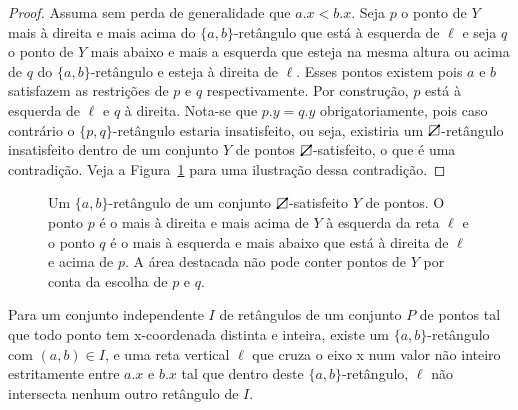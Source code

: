 \begin{proof}
    Assuma sem perda de generalidade que $a.x < b.x$.
    Seja $p$ o ponto de $Y$ mais à direita e mais acima do $\{a,b\}$-retângulo que está à esquerda de $\ell$ e seja $q$ o ponto de $Y$ mais abaixo e mais a esquerda que esteja na mesma altura ou acima de $q$ do $\{a,b\}$-retângulo e esteja à direita de $\ell$. Esses pontos existem pois $a$ e $b$ satisfazem as restrições de $p$ e $q$ respectivamente. Por construção, $p$ está à esquerda de $\ell$ e $q$ à direita. Nota-se que $p.y = q.y$ obrigatoriamente, pois caso contrário o $\{p,q\}$-retângulo estaria insatisfeito, ou seja, existiria um $\rectpos$-retângulo insatisfeito dentro de um conjunto $Y$ de pontos $\rectpos$-satisfeito, o que é uma contradição. Veja a Figura~\ref{fig:contraexemplo_contradicao} para uma ilustração dessa contradição.
\end{proof}

\begin{figure}
    \caption{Um $\{a,b\}$-retângulo de um conjunto $\protect\rectpos$-satisfeito $Y$ de pontos. O ponto $p$ é o mais à direita e mais acima de $Y$ à esquerda da reta $\ell$ e o ponto $q$ é o mais à esquerda e mais abaixo que está à direita de $\ell$ e acima de $p$. A área destacada não pode conter pontos de $Y$ por conta da escolha de $p$ e $q$.}
\label{fig:contraexemplo_contradicao}
\end{figure}
\begin{lemma} \label{lema_6.3}
    Para um conjunto independente $I$ de retângulos de um conjunto $P$ de pontos tal que todo ponto tem x-coordenada distinta e inteira, existe um $\{a,b\}$-retângulo com $(a,b) \in I$, e uma reta vertical $\ell$ que cruza o eixo x num valor não inteiro estritamente entre $a.x$ e $b.x$ tal que dentro deste $\{a,b\}$-retângulo, $\ell$ não intersecta nenhum outro retângulo de $I$.
\end{lemma}

